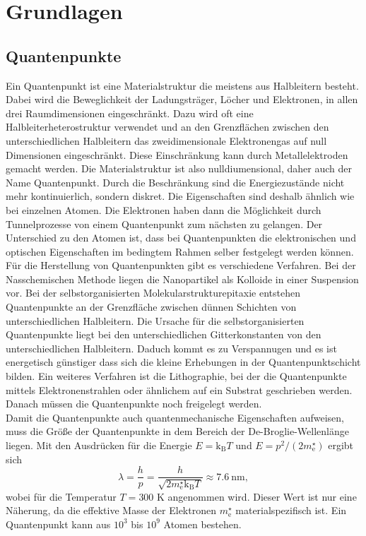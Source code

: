 \section{Grundlagen}\label{sec:Grundlagen}
\subsection{Quantenpunkte}
Ein Quantenpunkt \cite{quantum_dot} ist eine Materialstruktur die meistens aus Halbleitern besteht. Dabei wird die Beweglichkeit der Ladungsträger, Löcher und Elektronen, in allen drei Raumdimensionen eingeschränkt. 
Dazu wird oft eine Halbleiterheterostruktur verwendet und an den Grenzflächen zwischen den unterschiedlichen Halbleitern das zweidimensionale Elektronengas  auf null Dimensionen eingeschränkt. Diese Einschränkung kann durch Metallelektroden gemacht werden.
Die Materialstruktur ist also nulldiumensional, daher auch der Name Quantenpunkt.  Durch die Beschränkung sind die Energiezustände nicht mehr kontinuierlich, sondern diskret. Die Eigenschaften sind deshalb ähnlich wie bei einzelnen Atomen. 
Die Elektronen haben dann die Möglichkeit durch Tunnelprozesse von einem Quantenpunkt zum nächsten zu gelangen. 
Der Unterschied zu den Atomen ist, dass bei Quantenpunkten die elektronischen und optischen Eigenschaften im bedingtem Rahmen  selber festgelegt werden können. 
Für die Herstellung von Quantenpunkten gibt es verschiedene Verfahren. Bei der Nasschemischen Methode liegen die Nanopartikel als Kolloide in einer Suspension vor. Bei der selbstorganisierten Molekularstrukturepitaxie entstehen Quantenpunkte an der Grenzfläche zwischen dünnen Schichten von unterschiedlichen Halbleitern. Die Ursache für die selbstorganisierten Quantenpunkte liegt bei den unterschiedlichen Gitterkonstanten von den unterschiedlichen Halbleitern. Daduch kommt es zu Verspannugen und es ist energetisch günstiger dass sich die  kleine Erhebungen in der Quantenpunktschicht bilden. Ein weiteres Verfahren ist die Lithographie, bei der die Quantenpunkte mittels Elektronenstrahlen oder ähnlichem auf ein Substrat   \glqq geschrieben\grqq{} werden. Danach müssen die Quantenpunkte noch \glqq freigelegt\grqq{} werden. \\
Damit die Quantenpunkte auch quantenmechanische Eigenschaften aufweisen, muss die Grö{\ss}e der Quantenpunkte in dem Bereich der De-Broglie-Wellenlänge liegen.  Mit den Ausdrücken für die Energie $ E = \mathrm{k}_{\mathrm{B}} T$ und $ E = p^2/(2m_{\mathrm{e}}^\star)$ ergibt sich
\begin{equation}
\lambda = \frac{h}{p} = \frac{h}{\sqrt{2m_{\mathrm{e}}^\star \mathrm{k}_{\mathrm{B}} T}} \approx 7.6\ \mathrm{nm},
\end{equation}
 wobei für die Temperatur $T=300$ K angenommen wird. Dieser Wert ist nur eine Näherung, da die effektive Masse der Elektronen $m_{\mathrm{e}}^\star$ materialspezifisch ist. Ein Quantenpunkt kann aus $10^3$ bis $10^9$ Atomen bestehen. \\
 
